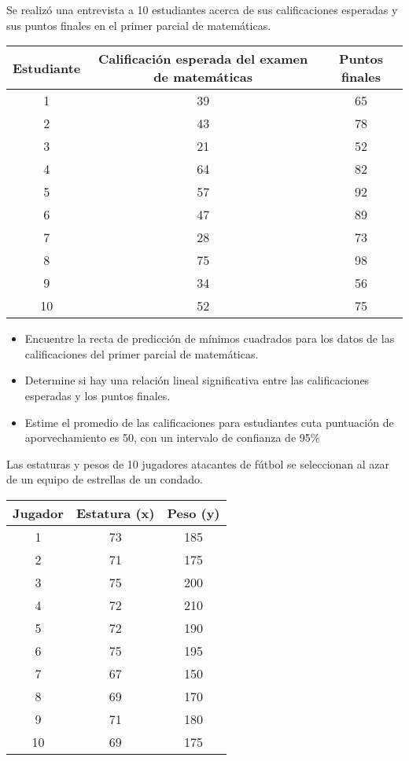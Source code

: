 \documentclass{../oxmathproblems}
\begin{document}
\begin{questions}


\miquestion Se realizó una entrevista a 10 estudiantes acerca de sus calificaciones  esperadas y sus puntos finales en el primer parcial de matemáticas. 

\begin{tabular}{|c|c|c|}
\hline
Estudiante & Calificación esperada del examen de matemáticas & Puntos finales \\ \hline
1 & 39 & 65\\
2 & 43 & 78\\
3 & 21  & 52\\ 
4& 64 & 82\\ 
5 & 57 & 92\\ 
6 & 47 & 89\\ 
7 & 28 & 73\\
8 & 75 & 98\\ 
9 & 34 & 56 \\ 
10 & 52 & 75\\ 
\hline
\end{tabular}

\begin{itemize}
  \item Encuentre la recta de predicción de mínimos cuadrados para los datos de las calificaciones del primer parcial de matemáticas.
  \item Determine si hay una relación lineal significativa entre las calificaciones esperadas y los puntos finales. 
  \item Estime el promedio de las calificaciones para estudiantes cuta puntuación de aporvechamiento es 50, con un intervalo de confianza de 95\%
\end{itemize}
 
 
\miquestion Las estaturas y pesos de 10 jugadores atacantes de fútbol se seleccionan al azar de un equipo de estrellas de un condado. 


\begin{tabular}{|c|c|c|}
\hline
Jugador & Estatura (x) & Peso (y) \\ \hline
1 & 73 & 185\\
2 & 71& 175\\
3 & 75  & 200\\ 
4& 72 & 210\\ 
5 & 72 & 190\\ 
6 & 75 & 195\\ 
7 & 67 & 150\\
8 & 69 & 170\\ 
9 & 71 &180 \\ 
10 & 69 & 175\\ 
\hline
\end{tabular}


\end{questions}
\end{document}
